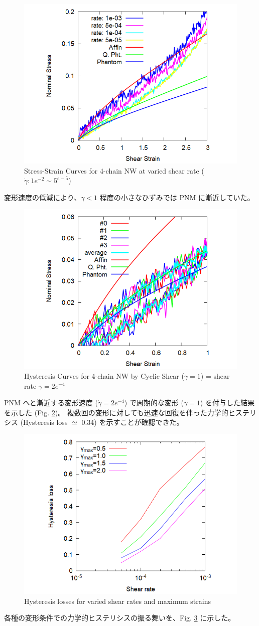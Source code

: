 \documentclass[uplatex,10pt,a4paper,twocolumn]{jsarticle}
\begin{document}
\begin{figure}[htb]
	\begin{center}
	\includegraphics[width=.43\textwidth]{Shear_Random_4chain_N20.png}
	\caption{Stress-Strain Curves for 4-chain NW at varied shear rate ($\dot{\gamma}: 1e^{-2} \sim 5^{e-5}$)}
	\label{fig:deform}
	\end{center}
\end{figure}
\vspace{-5mm}
変形速度の低減により、$\gamma<1$ 程度の小さなひずみでは PNM に漸近していた。


\vspace{-2mm}
\begin{figure}[htb]
	\begin{center}
	\includegraphics[width=.43\textwidth]{CyclicDeform_4chain_rate_2e-4.png}
	\caption{Hysteresis Curves for 4-chain NW by Cyclic Shear ($\gamma = 1$) = shear rate $\dot{\gamma} = 2e^{-4}$}
	\label{fig:hyst}
	\end{center}
\end{figure}
\vspace{-5mm}
PNM へと漸近する変形速度 ($\dot{\gamma} = 2e^{-4}$) で周期的な変形 ($\gamma = 1$) を付与した結果を示した (Fig. \ref{fig:hyst})。
複数回の変形に対しても迅速な回復を伴った力学的ヒステリシス (Hysteresis loss $\simeq$ 0.34) を示すことが確認できた。

\vspace{-2mm}
\begin{figure}[htb]
\centering
	\includegraphics[width=.43\textwidth]{hyst_shear.png}
\caption{Hysteresis losses for varied shear rates and maximum strains}
\label{fig:hystloss}
\end{figure}
\vspace{-5mm}
各種の変形条件での力学的ヒステリシスの振る舞いを、Fig. \ref{fig:hystloss} に示した。
\end{document}
